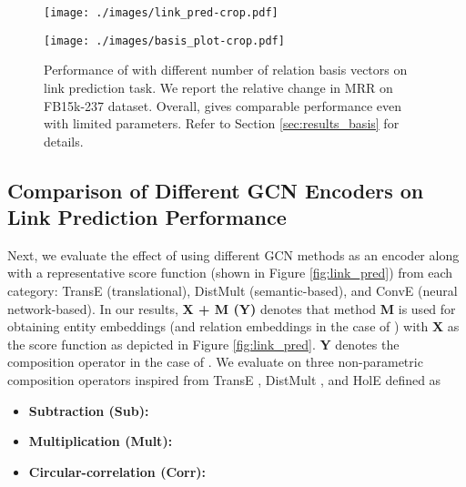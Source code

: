 \documentclass{article} \usepackage{iclr2020_conference,times}
\begin{document}
\begin{figure*}[t]
	\centering
	\begin{minipage}{.485\textwidth}
		\centering
		\texttt{[image: ./images/link\_pred-crop.pdf]}
		\caption{\label{fig:link_pred} \small Knowledge Graph link prediction with \method{} and other methods. \method{} generates both entity and relation embedding as opposed to just entity embeddings for other models. For more details, please refer to Section \ref{sec:results_gcn_encoder}}
	\end{minipage} \quad
	\begin{minipage}{0.47\textwidth}
		\centering
		\texttt{[image: ./images/basis\_plot-crop.pdf]}
		\caption{\label{fig:basis_plot} \small Performance of \method{} with different number of relation basis vectors on link prediction task. We report the relative change in MRR on FB15k-237 dataset. Overall, \method{} gives comparable performance even with limited parameters. Refer to Section \ref{sec:results_basis} for details.}
	\end{minipage} \vspace{-4mm}
\end{figure*}

\vspace{-1mm}
\subsection{Comparison of Different GCN Encoders on Link Prediction Performance}
\label{sec:results_gcn_encoder}
\vspace{-1mm}

Next, we evaluate the effect of using different GCN methods as an encoder along with a representative score function (shown in Figure \ref{fig:link_pred}) from each category: TransE (translational), DistMult (semantic-based), and ConvE (neural network-based).  In our results, \textbf{X + M (Y)}  denotes that method \textbf{M} is used for obtaining entity embeddings (and relation embeddings in the case of \method{}) with \textbf{X} as the score function as depicted in Figure \ref{fig:link_pred}. \textbf{Y} denotes the composition operator in the case of \method{}. We evaluate \method{} on three non-parametric composition operators inspired from TransE \citep{transe}, DistMult \citep{distmult}, and HolE \citep{hole} defined as
\begin{itemize}[itemsep=1pt,topsep=1pt,parsep=0pt,partopsep=0pt,leftmargin=5.5mm]
	\item \textbf{Subtraction (Sub):} 
	\item \textbf{Multiplication (Mult):} 
	\item \textbf{Circular-correlation (Corr):} 
\end{itemize}
\end{document}
